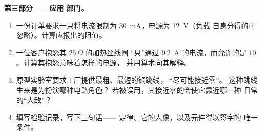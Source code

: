 \begin{problem}
\medskip\noindent\textbf{第三部分——应用
部门。}
\begin{enumerate}[resume]
  \item 一份订单要求一只将电流限制为
        \qty{30}{mA}，电源为 \qty{12}{V}（负载
        自身分得的可忽略）。计算应报出的阻值。
  \item 一位客户抱怨其 $25\,\Omega$ 的加热丝线圈
        “只”通过 \qty{9.2}{A} 的电流，而允许的是
        $10$。计算其抱怨意味着怎样的电源，
        并用算术向其解释。
  \item 原型实验室要求工厂提供最粗、最短的铜跳线，
        “尽可能接近零”。
        这种跳线生来是为扮演哪种电路角色？
        若被误用，其接近零的会使它靠近哪一种
        日常的“大敌”？
  \item 填写检验记录，写下三句话——
        定律、它的人像，以及元件得以签字的
        唯一条件。
\end{enumerate}
\end{problem}
